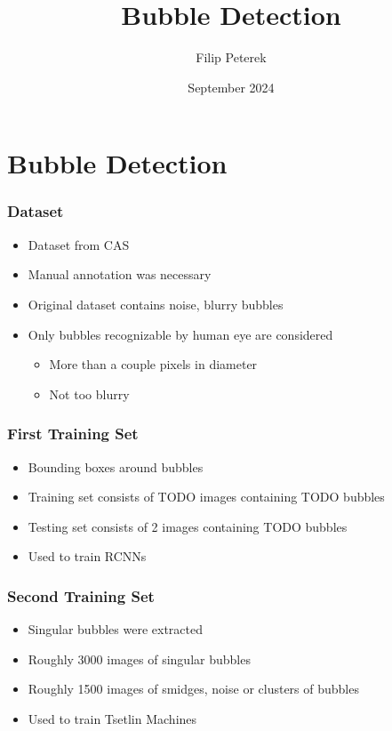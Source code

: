 \documentclass{beamer}
\title{Bubble Detection}
\author{Filip Peterek}
\institute{V\v{S}B-TUO}
\date{September 2024}
\begin{document}
\frame{\titlepage}

\section{Bubble Detection}

\begin{frame}
    \frametitle{Dataset}

    \begin{itemize}
        \item Dataset from CAS
        \item Manual annotation was necessary
        \item Original dataset contains noise, blurry bubbles
        \item Only bubbles recognizable by human eye are considered
        \begin{itemize}
            \item More than a couple pixels in diameter
            \item Not too blurry
        \end{itemize}
    \end{itemize}

\end{frame}

\begin{frame}
    \frametitle{First Training Set}

    \begin{itemize}
        \item Bounding boxes around bubbles
        \item Training set consists of TODO images containing TODO bubbles
        \item Testing set consists of 2 images containing TODO bubbles
        \item Used to train RCNNs
    \end{itemize}

\end{frame}

\begin{frame}
    \frametitle{Second Training Set}

    \begin{itemize}
        \item Singular bubbles were extracted
        \item Roughly 3000 images of singular bubbles
        \item Roughly 1500 images of smidges, noise or clusters of bubbles
        \item Used to train Tsetlin Machines
    \end{itemize}

\end{frame}
\end{document}
